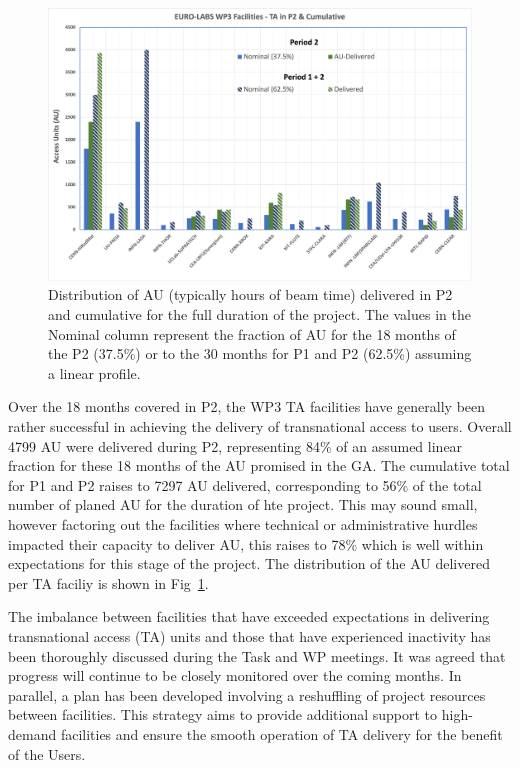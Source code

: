 \begin{figure}[!h]
    \centering
    \includegraphics[width=0.98\linewidth]{graphics/WP3-TAstatistics.png}
    \caption{Distribution of AU (typically hours of beam time) delivered in P2 and cumulative for the full duration of the project. The values in the Nominal column represent the fraction of AU for the 18 months of the P2 (37.5\%) or to the 30 months for P1 and P2 (62.5\%) assuming a linear profile.}
    \label{fig:wpe-taunits}
\end{figure}
Over the 18 months covered in P2, the WP3 TA facilities have generally been rather successful in achieving the delivery of transnational access to users. Overall 4799 AU were delivered during P2, representing 84\% of an assumed linear fraction for these 18 months of the AU promised in the GA. The cumulative total for P1 and P2 raises to 7297 AU delivered, corresponding to 56\% of the total number of planed AU for the duration of hte project. This may sound small, however factoring out the facilities where technical or administrative hurdles impacted their capacity to deliver AU, this raises to 78\% which is well within expectations for this stage of the project. The distribution of the AU delivered per TA faciliy is shown in Fig~\ref{fig:wpe-taunits}.

The imbalance between facilities that have exceeded expectations in delivering transnational access (TA) units and those that have experienced inactivity has been thoroughly discussed during the Task and WP meetings. It was agreed that progress will continue to be closely monitored over the coming months. In parallel, a plan has been developed involving a reshuffling of project resources between facilities. This strategy aims to provide additional support to high-demand facilities and ensure the smooth operation of TA delivery for the benefit of the Users.

